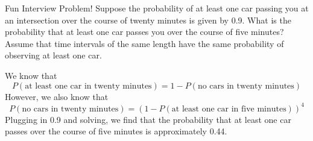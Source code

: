\documentclass[11pt]{article}
\begin{document}
\begin{exercise}{Fun Interview Problem!}
Suppose the probability of at least one car passing you at an intersection over the course of twenty minutes is given by 0.9. What is the probability that at least one car passes you over the course of five minutes? Assume that time intervals of the same length have the same probability of observing at least one car. 
\end{exercise}

\begin{solution}{2}
We know that 
    $$P(\text{at least one car in twenty minutes}) = 1 - P(\text{no cars in twenty minutes})$$ 
However, we also know that 
    $$P(\text{no cars in twenty minutes}) = (1-P(\text{at least one car in 
     five minutes}))^4$$
Plugging in 0.9 and solving, we find that the probability that at least one car passes over the course of five minutes is approximately 0.44.      
\end{solution}
\end{document}
